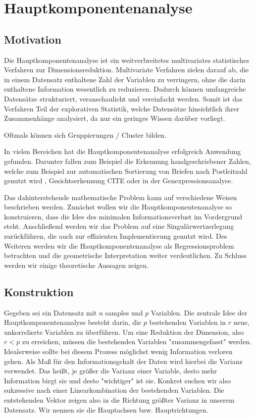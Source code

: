 \chapter{Hauptkomponentenanalyse}

\label{pca}

\section{Motivation}

Die Hauptkomponentenanalyse ist ein weitverbreitetes multivariates statistisches Verfahren zur Dimensionsreduktion. Multivariate Verfahren zielen darauf ab, die in einem Datensatz enthaltene Zahl der Variablen zu verringern, ohne die darin enthaltene Information wesentlich zu reduzieren. Dadurch können umfangreiche Datensätze strukturiert, veranschaulicht und vereinfacht werden. Somit ist das Verfahren Teil der explorativen Statistik, welche Datensätze hinsichtlich ihrer Zusammenhänge analysiert, da nur ein geringes Wissen darüber vorliegt.

Oftmals können sich Gruppierungen / Cluster bilden.

In vielen Bereichen hat die Hauptkomponentenanalyse erfolgreich Anwendung gefunden. Darunter fallen zum Beispiel die Erkennung handgeschriebener Zahlen, welche zum Beispiel zur automatischen Sortierung von Briefen nach Postleitzahl genutzt wird \cite{hastie_elements}, Gesichtserkennung CITE oder in der Genexpressionsanalyse.

Das dahinterstehende mathematische Problem kann auf verschiedene Weisen beschrieben werden. Zunächst wollen wir die Hauptkomponentenanalyse so konstruieren, dass die Idee des minimalen Informationsverlust im Vordergrund steht. Anschließend werden wir das Problem auf eine Singulärwertzerlegung zurückführen, die auch zur effizienten Implementierung genutzt wird. Des Weiteren werden wir die Hauptkomponentenanalyse als Regressionsproblem betrachten und die geometrische Interpretation weiter verdeutlichen. Zu Schluss werden wir einige theoretische Aussagen zeigen.

\section{Konstruktion}

Gegeben sei ein Datensatz mit $n$ samples und $p$ Variablen. Die zentrale Idee der Hauptkomponentenanalyse besteht darin, die $p$ bestehenden Variablen in $r$ neue, unkorrelierte Variablen zu überführen. Um eine Reduktion der Dimension, also $r < p$ zu erreichen, müssen die bestehenden Variablen "zusammengefasst" werden. Idealerweise sollte bei diesem Prozess möglichst wenig Information verloren gehen. Als Maß für den Informationsgehalt der Daten wird hierbei die Varianz verwendet. Das heißt, je größer die Varianz einer Variable, desto mehr Information birgt sie und desto "wichtiger" ist sie. Konkret suchen wir also sukzessive nach einer Linearkombination der bestehenden Variablen. Die entstehenden Vektor zeigen also in die Richtung größter Varianz in unserem Datensatz. Wir nennen sie die Hauptachsen bzw. Hauptrichtungen.

